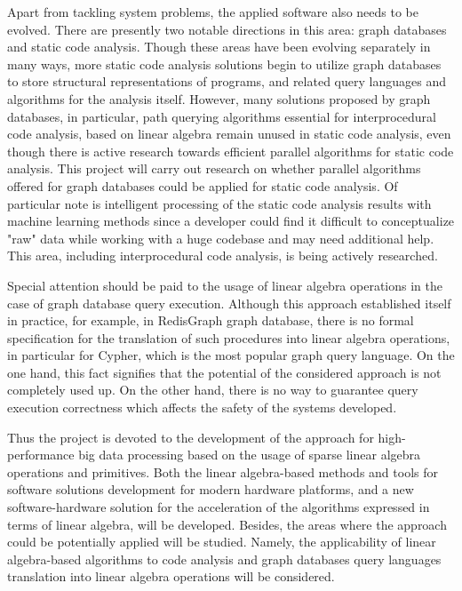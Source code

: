 \documentclass[12pt]{article}  %
\theoremstyle{remark}
\begin{document}
Apart from tackling system problems, the applied software also needs to be evolved. There are presently two notable directions in this area: graph databases and static code analysis. Though these areas have been evolving separately in many ways, more static code analysis solutions begin to utilize graph databases to store structural representations of programs, and related query languages and algorithms for the analysis itself. However, many solutions proposed by graph databases, in particular, path querying algorithms essential for interprocedural code analysis, based on linear algebra remain unused in static code analysis, even though there is active research towards efficient parallel algorithms for static code analysis. This project will carry out research on whether parallel algorithms offered for graph databases could be applied for static code analysis. Of particular note is intelligent processing of the static code analysis results with machine learning methods since a developer could find it difficult to conceptualize "raw" data while working with a huge codebase and may need additional help. This area, including interprocedural code analysis, is being actively researched.

Special attention should be paid to the usage of linear algebra operations in the case of graph database query execution. Although this approach established itself in practice, for example, in RedisGraph graph database, there is no formal specification for the translation of such procedures into linear algebra operations, in particular for Cypher, which is the most popular graph query language. On the one hand, this fact signifies that the potential of the considered approach is not completely used up. On the other hand, there is no way to guarantee query execution correctness which affects the safety of the systems developed.

Thus the project is devoted to the development of the approach for high-performance big data processing based on the usage of sparse linear algebra operations and primitives. Both the linear algebra-based methods and tools for software solutions development for modern hardware platforms, and a new software-hardware solution for the acceleration of the algorithms expressed in terms of linear algebra, will be developed. Besides, the areas where the approach could be potentially applied will be studied. Namely, the applicability of linear algebra-based algorithms to code analysis and graph databases query languages translation into linear algebra operations will be considered.
\end{document}
